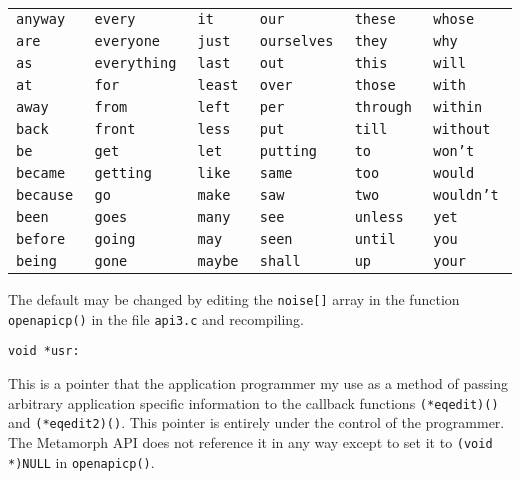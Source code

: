\begin{tabular}{llllll}
{\tt anyway }   & {\tt every }      & {\tt it }     & {\tt our }       & {\tt these }     & {\tt whose } \\
{\tt are }      & {\tt everyone }   & {\tt just }   & {\tt ourselves } & {\tt they }      & {\tt why } \\
{\tt as }       & {\tt everything } & {\tt last }   & {\tt out }       & {\tt this }      & {\tt will } \\
{\tt at }       & {\tt for }        & {\tt least }  & {\tt over }      & {\tt those }     & {\tt with } \\
{\tt away }     & {\tt from }       & {\tt left }   & {\tt per }       & {\tt through }   & {\tt within } \\
{\tt back }     & {\tt front }      & {\tt less }   & {\tt put }       & {\tt till }      & {\tt without } \\
{\tt be }       & {\tt get }        & {\tt let }    & {\tt putting }   & {\tt to }        & {\tt won't } \\
{\tt became }   & {\tt getting }    & {\tt like }   & {\tt same }      & {\tt too }       & {\tt would } \\
{\tt because }  & {\tt go }         & {\tt make }   & {\tt saw }       & {\tt two }       & {\tt wouldn't } \\
{\tt been }     & {\tt goes }       & {\tt many }   & {\tt see }       & {\tt unless }    & {\tt yet } \\
{\tt before }   & {\tt going }      & {\tt may }    & {\tt seen }      & {\tt until }     & {\tt you } \\
{\tt being }    & {\tt gone }       & {\tt maybe }  & {\tt shall }     & {\tt up }        & {\tt your } \\
\end{tabular}

The default may be changed by editing the \verb`noise[]` array in the
function \verb`openapicp()` in the file \verb`api3.c` and recompiling.

\begin{verbatim}
void *usr:
\end{verbatim}

This is a pointer that the application programmer my use as a
method of passing arbitrary application specific information to
the callback functions \verb`(*eqedit)()` and \verb`(*eqedit2)()`.  This pointer
is entirely under the control of the programmer.  The Metamorph
API does not reference it in any way except to set it to
\verb`(void *)NULL` in \verb`openapicp()`.


